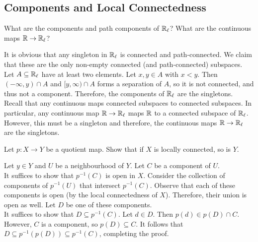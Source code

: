\subsection{Components and Local Connectedness}

	\begin{exercise}
		What are the components and path components of $\mathbb{R}_\ell$? What are the continuous maps $\mathbb{R}\to\mathbb{R}_\ell$?
	\end{exercise}
	\begin{solution*}
		It is obvious that any singleton in $\mathbb{R}_\ell$ is connected and path-connected. We claim that these are the only non-empty connected (and path-connected) subspaces. Let $A\subseteq\mathbb{R}_\ell$ have at least two elements. Let $x,y\in A$ with $x<y$. Then $(-\infty,y)\cap A$ and $[y,\infty)\cap A$ forms a separation of $A$, so it is not connected, and thus not a component. Therefore, the components of $\mathbb{R}_\ell$ are the singletons.\\
		Recall that any continuous maps connected subspaces to connected subspaces. In particular, any continuous map $\mathbb{R}\to\mathbb{R}_\ell$ maps $\mathbb{R}$ to a connected subspace of $\mathbb{R}_\ell$. However, this must be a singleton and therefore, the continuous maps $\mathbb{R}\to\mathbb{R}_\ell$ are the singletons.
	\end{solution*}

	\setcounter{exercise}{7}
	\begin{exercise}
		Let $p:X\to Y$ be a quotient map. Show that if $X$ is locally connected, so is $Y$.
	\end{exercise}
	\begin{solution*}
		Let $y\in Y$ and $U$ be a neighbourhood of $Y$. Let $C$ be a component of $U$.\\
		It suffices to show that $p^{-1}(C)$ is open in $X$.
		Consider the collection of components of $p^{-1}(U)$ that intersect $p^{-1}(C)$. Observe that each of these components is open (by the local connectedness of $X$). Therefore, their union is open as well. Let $D$ be one of these components.\\
		It suffices to show that $D\subseteq p^{-1}(C)$. Let $d\in D$. Then $p(d) \in p(D)\cap C$. However, $C$ is a component, so $p(D)\subseteq C$. It follows that $D\subseteq p^{-1}(p(D)) \subseteq p^{-1}(C)$, completing the proof.
	\end{solution*}

